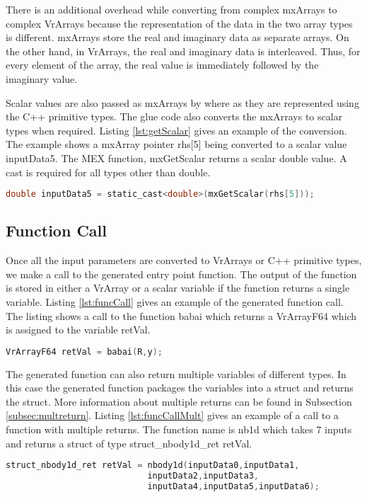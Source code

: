 There is an additional overhead while converting from complex mxArrays to complex VrArrays because the representation of the data in the two array types is different. mxArrays store the real and imaginary data as separate arrays. On the other hand, in VrArrays, the real and imaginary data is interleaved. Thus, for every element of the array, the real value is immediately followed by the imaginary value.

Scalar values are also passed as mxArrays by \matlab where as they are represented using the C++ primitive types. The glue code also converts the mxArrays to scalar types when required. Listing \ref{lst:getScalar} gives an example of the conversion. The example shows a mxArray pointer rhs[5] being converted to a scalar value inputData5. The MEX function, mxGetScalar returns a scalar double value. A cast is required for all types other than double.
\begin{lstlisting}[language=c,caption={Converting mxArrays to scalars},label={lst:getScalar}]
 double inputData5 = static_cast<double>(mxGetScalar(rhs[5]));
\end{lstlisting}

\subsection{Function Call}
Once all the input parameters are converted to VrArrays or C++ primitive types, we make a call to the generated entry point function. The output of the function is stored in either a VrArray or a scalar variable if the function returns a single variable. Listing \ref{lst:funcCall} gives an example of the generated function call. The listing shows a call to the function babai which returns a VrArrayF64 which is assigned to the variable retVal.
\begin{lstlisting}[language=c,caption={Call to generated function},label={lst:funcCall}]
VrArrayF64 retVal = babai(R,y);
\end{lstlisting}

The generated function can also return multiple variables of different types. In this case the generated function packages the  variables into a struct and returns the struct. More information about multiple returns can be found in Subsection \ref{subsec:multreturn}. Listing \ref{lst:funcCallMult} gives an example of a call to a function with multiple returns. The function name is nb1d which takes 7 inputs and returns a struct of type struct\_nbody1d\_ret retVal.
\begin{lstlisting}[language=c,caption={Call to generated function},label={lst:funcCallMult}]
struct_nbody1d_ret retVal = nbody1d(inputData0,inputData1,
							inputData2,inputData3,
							inputData4,inputData5,inputData6);
\end{lstlisting}
